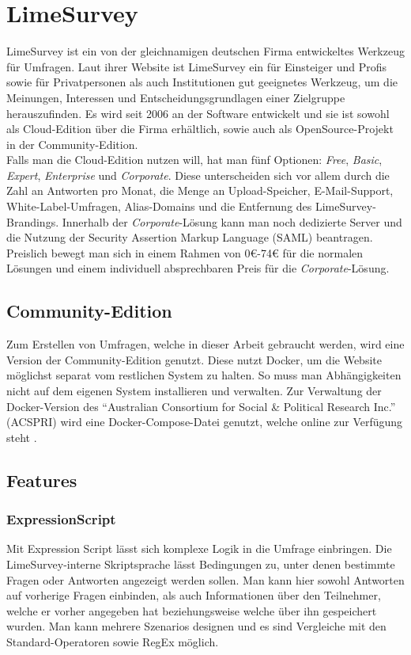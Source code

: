 \section{LimeSurvey}

LimeSurvey ist ein von der gleichnamigen deutschen Firma entwickeltes Werkzeug für Umfragen.
Laut ihrer Website\cite{ls} ist LimeSurvey ein für Einsteiger und Profis sowie für Privatpersonen als auch Institutionen gut geeignetes Werkzeug, um die Meinungen, Interessen und Entscheidungsgrundlagen einer Zielgruppe herauszufinden.
Es wird seit 2006 an der Software entwickelt und sie ist sowohl als Cloud-Edition über die Firma erhältlich, sowie auch als OpenSource-Projekt in der Community-Edition.\\

Falls man die Cloud-Edition nutzen will, hat man fünf Optionen: \textit{Free}, \textit{Basic}, \textit{Expert}, \textit{Enterprise} und \textit{Corporate}.
Diese unterscheiden sich vor allem durch die Zahl an Antworten pro Monat, die Menge an Upload-Speicher, E-Mail-Support, White-Label-Umfragen, Alias-Domains und die Entfernung des LimeSurvey-Brandings.
Innerhalb der \textit{Corporate}-Lösung kann man noch dedizierte Server und die Nutzung der Security Assertion Markup Language (SAML) beantragen.
Preislich bewegt man sich in einem Rahmen von 0€-74€ für die normalen Lösungen und einem individuell absprechbaren Preis für die \textit{Corporate}-Lösung.

\subsection{Community-Edition}

Zum Erstellen von Umfragen, welche in dieser Arbeit gebraucht werden, wird eine Version der Community-Edition genutzt.
Diese nutzt Docker, um die Website möglichst separat vom restlichen System zu halten.
So muss man Abhängigkeiten nicht auf dem eigenen System installieren und verwalten.
Zur Verwaltung der Docker-Version des \enquote{Australian Consortium for Social \& Political Research Inc.} (ACSPRI) wird eine Docker-Compose-Datei genutzt, welche online zur Verfügung steht \cite{docker_comp}.

\subsection{Features}
\subsubsection{ExpressionScript}
\label{m:expr_script}
Mit Expression Script lässt sich komplexe Logik in die Umfrage einbringen.
Die LimeSurvey-interne Skriptsprache lässt Bedingungen zu, unter denen bestimmte Fragen oder Antworten angezeigt werden sollen.
Man kann hier sowohl Antworten auf vorherige Fragen einbinden, als auch Informationen über den Teilnehmer, welche er vorher angegeben hat beziehungsweise welche über ihn gespeichert wurden.
Man kann mehrere Szenarios designen und es sind Vergleiche mit den Standard-Operatoren sowie RegEx möglich.

